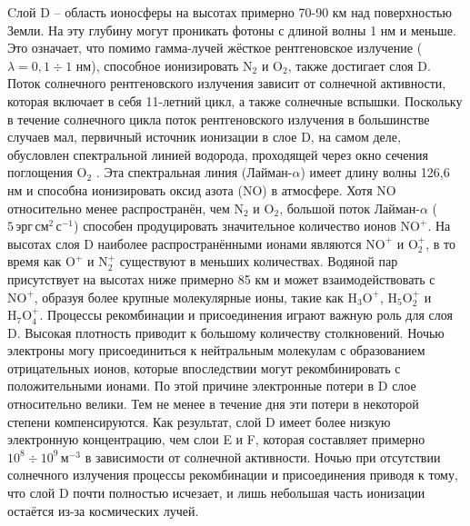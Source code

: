 Cлой D -- область ионосферы на высотах примерно 70-90 км над поверхностью Земли.
На эту глубину могут проникать фотоны с длиной волны 1 нм и меньше. 
Это означает, что помимо гамма-лучей жёсткое рентгеновское излучение ($\lambda=0,1\div 1$ нм), способное ионизировать $\text{N}_2$ и $\text{O}_2$, также достигает слоя D.
Поток солнечного рентгеновского излучения зависит от солнечной активности, которая включает в себя 11-летний цикл, а также солнечные вспышки.
Поскольку в течение солнечного цикла поток рентгеновского излучения в большинстве случаев мал, первичный источник ионизации в слое D, на самом деле, обусловлен спектральной линией водорода, проходящей через окно сечения поглощения $\text{O}_2$ \cite{Rishbeth2003}.
Эта спектральная линия (Лайман-$\alpha$) имеет длину волны 126,6 нм и способна ионизировать оксид азота (NO) в атмосфере. 
Хотя NO относительно менее распространён, чем $\text{N}_2$ и $\text{O}_2$, большой поток Лайман-$\alpha$ ($5\,\text{эрг}\,\text{см}^2\,\text{с}^{-1}$) способен продуцировать значительное количество ионов $\text{NO}^{+}$.
На высотах слоя D наиболее распространёнными ионами являются $\text{NO}^{+}$ и $\text{O}_2^{+}$, в то время как $\text{O}^{+}$ и $\text{N}_2^{+}$ существуют в меньших количествах.
Водяной пар присутствует на высотах ниже примерно 85 км и может взаимодействовать с $\text{NO}^{+}$, образуя более крупные молекулярные ионы, такие как $\text{H}_3\text{O}^{+}$, $\text{H}_5\text{O}_2^{+}$ и $\text{H}_7\text{O}_4^{+}$. 
Процессы рекомбинации и присоединения играют важную роль для слоя D.
Высокая плотность приводит к большому количеству столкновений.
Ночью электроны могу присоединиться к нейтральным молекулам с образованием отрицательных ионов, которые впоследствии могут рекомбинировать с положительными ионами.
По этой причине электронные потери в D слое относительно велики.
Тем не менее в течение дня эти потери в некоторой степени компенсируются.
Как результат, слой D имеет более низкую электронную концентрацию, чем слои E и F, которая составляет примерно $10^8\div10^9\,\text{м}^{-3}$ в зависимости от солнечной активности. 
Ночью при отсутствии солнечного излучения процессы рекомбинации и присоединения приводя к тому, что слой D почти полностью исчезает, и лишь небольшая часть ионизации остаётся из-за космических лучей.

